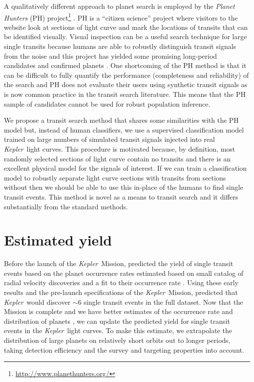\documentclass[12pt,preprint]{aastex}
\newcommand{\project}[1]{\textsl{#1}}
\newcommand{\kepler}{\project{Kepler}}
\begin{document}
A qualitatively different approach to planet search is employed by the
\project{Planet Hunters} (PH)
project\footnote{\url{http://www.planethunters.org/}} \citep{Fischer:2012}.
PH is a ``citizen science'' project where visitors to the website look at
sections of light curve and mark the locations of transits that can be
identified visually.
Visual inspection can be a useful search technique for large single transits
because humans are able to robustly distinguish transit signals from the noise
and this project has yielded some promising long-period candidates and
confirmed planets \citep[for example][]{Wang:2013}.
One shortcoming of the PH method is that it can be difficult to fully quantify
the performance (completeness and reliability) of the search and PH does not
evaluate their users using synthetic transit signals as is now common practice
in the transit search literature.
This means that the PH sample of candidates cannot be used for robust
population inference.

We propose a transit search method that shares some similarities with the PH
model but, instead of human classifiers, we use a supervised classification
model trained on large numbers of simulated transit signals injected into
real \kepler\ light curves.
This procedure is motivated because, by definition, most randomly selected
sections of light curve contain no transits and there is an excellent physical
model for the signals of interest.
If we can train a classification model to robustly separate light curve
sections with transits from sections without then we should be able to use
this in-place of the humans to find single transit events.
This method is novel as a means to transit search and it differs substantially
from the standard methods.


\section{Estimated yield}

Before the launch of the \kepler\ Mission, \citet{Yee:2008} predicted the
yield of single transit events based on the planet occurrence rates estimated
based on small catalog of radial velocity discoveries \citep{Butler:2006} and
a fit to their occurrence rate \citep{Cumming:2008}.
Using these early results and the pre-launch specifications of the \kepler\
Mission, \citet{Yee:2008} predicted that \kepler\ would discover $\sim 6$
single transit events in the full dataset.
Now that the Mission is complete and we have better estimates of the
occurrence rate and distribution of planets \citep[for example][]{Dong:2013,
Petigura:2013, Foreman-Mackey:2014, Dressing:2015}, we can update the
predicted yield for single transit events in the \kepler\ light curves.
To make this estimate, we extrapolate the distribution of large planets on
relatively short orbits out to longer periods, taking detection efficiency
and the survey and targeting properties into account.
\end{document}

